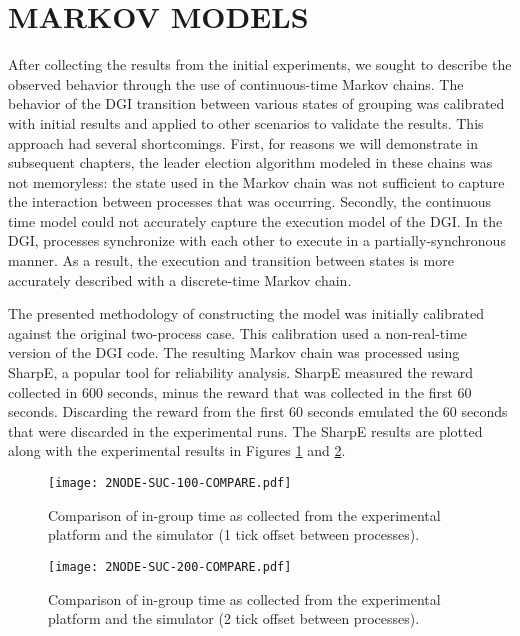 \section{MARKOV MODELS}

After collecting the results from the initial experiments, we sought to describe the observed behavior through the use of continuous-time Markov chains.
The behavior of the DGI transition between various states of grouping was calibrated with initial results and applied to other scenarios to validate the results.
This approach had several shortcomings.
First, for reasons we will demonstrate in subsequent chapters, the leader election algorithm modeled in these chains was not memoryless: the state used in the Markov chain was not sufficient to capture the interaction between processes that was occurring.
Secondly, the continuous time model could not accurately capture the execution model of the DGI.
In the DGI, processes synchronize with each other to execute in a partially-synchronous manner.
As a result, the execution and transition between states is more accurately described with a discrete-time Markov chain.

The presented methodology of constructing the model was initially calibrated against the original two-process case.
This calibration used a non-real-time version of the DGI code.
The resulting Markov chain was processed using SharpE\cite{SHARPE}\cite{SHARPE2}, a popular tool for reliability analysis.
SharpE measured the reward collected in 600 seconds, minus the reward that was collected in the first 60 seconds. 
Discarding the reward from the first 60 seconds emulated the 60 seconds that were discarded in the experimental runs.
The SharpE results are plotted along with the experimental results in Figures \ref{fig:COMPARE-SUC-2NODE-100} and \ref{fig:COMPARE-SUC-2NODE-200}.

\begin{figure}
    \centering
    \texttt{[image: 2NODE-SUC-100-COMPARE.pdf]}
    \caption{Comparison of in-group time as collected from the experimental platform and the simulator (1 tick offset between processes).}
    \label{fig:COMPARE-SUC-2NODE-100}
\end{figure}%
\begin{figure}
    \centering
    \texttt{[image: 2NODE-SUC-200-COMPARE.pdf]}
    \caption{Comparison of in-group time as collected from the experimental platform and the simulator (2 tick offset between processes).}
    \label{fig:COMPARE-SUC-2NODE-200}
\end{figure}


